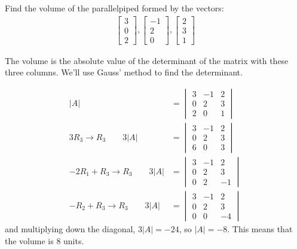\begin{example}
Find the volume of the parallelpiped formed by the vectors:
%
\begin{align*}
\begin{bmatrix}
3 \\ 0 \\ 2
\end{bmatrix}, \begin{bmatrix}
-1 \\ 2 \\ 0 
\end{bmatrix}, \begin{bmatrix}
2 \\ 3 \\ 1 
\end{bmatrix}
\end{align*}

\solution

The volume is the absolute value of the determinant of the matrix with these three columns.  We'll use Gauss' method to find the determinant.  

%
\begin{align*}
|A| &= \begin{vmatrix}
3 & -1 & 2 \\
0 & 2 & 3 \\
2 & 0 & 1 
\end{vmatrix} \\
3R_3 \rightarrow R_3 \qquad 
3|A| &= \begin{vmatrix}
3 & -1 & 2 \\
0 & 2 & 3 \\
6 & 0 & 3 
\end{vmatrix} \\
-2 R_1 + R_3 \rightarrow R_3 \qquad
3|A| &= \begin{vmatrix}
3 & -1 & 2 \\
0 & 2 & 3 \\
0 & 2 & -1 
\end{vmatrix} \\
-R_2 + R_3 \rightarrow R_3 \qquad 
3|A| &= \begin{vmatrix}
3 & -1 & 2 \\
0 & 2 & 3 \\
0 & 0 & -4
\end{vmatrix} 
\end{align*}
and multiplying down the diagonal,  $3|A| = -24$, so $|A|=-8$.  This means that the volume is 8 units.  
\end{example}

\vfill \pagebreak
